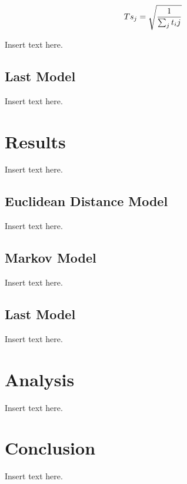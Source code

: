 \documentclass[twoside,twocolumn]{article}
\begin{document}
\begin{equation}
\begin{aligned}
Ts_j = \sqrt{1\over{\sum_j{t_ij}}}
\end{aligned}
\end{equation}


Insert text here.
\subsection{Last Model} %
Insert text here.

\section{Results}
\label{sec:res}
Insert text here.
\subsection{Euclidean Distance Model}
Insert text here.
\subsection{Markov Model}
Insert text here.
\subsection{Last Model}
Insert text here.

\section{Analysis}
\label{sec:analysis}
Insert text here.

\section{Conclusion}
\label{sec:conclusion}
Insert text here.

\end{document}
